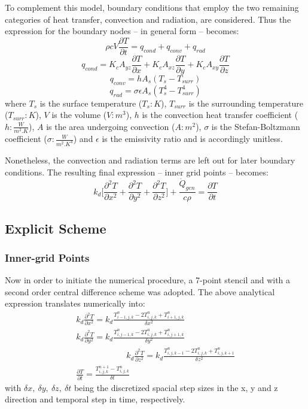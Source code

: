 \documentclass[a4paper,10pt]{IEEEtran}
\begin{document}
	To complement this model, boundary conditions that employ the two remaining categories of heat transfer, convection and radiation, are considered. Thus the expression for the boundary nodes -- in general form -- becomes:
	\begin{equation}
		\rho c V \frac{\partial T}{\partial t} = q_{cond} + q_{conv} + q_{rad}
	\end{equation}
	$$q_{cond} = K_c A_{yz}\frac{\partial T}{\partial x} + K_c A_{xz}\frac{\partial T}{\partial y} + K_c A_{xy}\frac{\partial T}{\partial z} $$
	$$q_{conv} = hA_s(T_{s} - T_{surr})$$
	$$q_{rad} = \sigma \epsilon A_s (T_s^4 - T_{surr}^4) $$ 
	where $T_s$ is the surface temperature ($T_s: K$), $T_{surr}$ is the surrounding temperature ($T_{surr}: K$),  $V$ is the volume ($V: m^3$), $h$ is the convection heat transfer coefficient ($h: \frac{W}{m^2.K}$), $A$ is the area undergoing convection ($A: m^2$), $\sigma$ is the Stefan-Boltzmann coefficient ($\sigma: \frac{W}{m^2.K^4}$) and $\epsilon$ is the emissivity ratio and is accordingly unitless.
	
	Nonetheless, the convection and radiation terms are left out for later boundary conditions. The resulting final expression -- inner grid points -- becomes:
	\begin{equation}
		k_d\Bigg[ \frac{\partial^2 T}{\partial x^2}+\frac{\partial^2 T}{\partial y^2}+\frac{\partial^2 T}{\partial z^2} \Bigg] + \frac{\dot{Q}_{gen}}{c\rho} = \frac{\partial T}{\partial t}
	\end{equation}
	
	\subsection{Explicit Scheme}
	\subsubsection{Inner-grid Points}		
	Now in order to initiate the numerical procedure, a 7-point stencil and with a second order central difference scheme was adopted. The above analytical expression translates numerically into:
	\begin{multline}
		k_d\frac{\partial^2 T}{\partial x^2}=k_d\frac{T_{i-1,j,k}^n-2T_{i,j,k}^n+T_{i+1,j,k}^n}{\delta x^2}\\ 
		k_d\frac{\partial^2 T}{\partial y^2}=k_d\frac{T_{i,j-1,k}^n-2T_{i,j,k}^n+T_{i,j+1,k}^n}{\delta y^2}\\
		\qquad \qquad \qquad k_d\frac{\partial^2 T}{\partial z^2}=k_d\frac{T_{i,j,k-1}^n-2T_{i,j,k}^n+T_{i,j,k+1}^n}{\delta z^2}\\
		\frac{\partial T}{\partial t} = \frac{T_{i,j,k}^{n+1}-T_{i,j,k}^{n}}{\delta t}
	\end{multline}
	with $\delta x,\ \delta y,\ \delta z,\ \delta t$ being the discretized spacial step sizes in the x, y and z direction and temporal step in time, respectively. 
	
\end{document}
